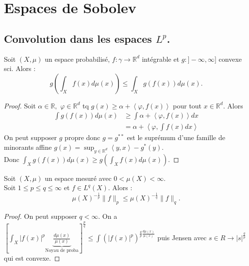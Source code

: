 \section{Espaces de Sobolev}
\subsection{Convolution dans les espaces \texorpdfstring{$L^p$}{TEXT}.}
\begin{propriete}
    Soit $(X,\mu)$ un espace probabilisé, $f:\gamma\to \mathbb{R} ^d$ intégrable et $g:]-\infty ,\infty ]$ convexe sci. Alors :
    $$g\left(\int_Xf(x)d\mu(x)\right)\le \int_Xg(f(x))d\mu(x).$$
\end{propriete}
\begin{proof}
    Soit $\alpha \in \mathbb{R} ,$ $\varphi \in \mathbb{R} ^d$ tq $g(x)\ge \alpha +\left<\varphi ,f(x) \right>$ pour tout $x\in \mathbb{R} ^d.$ Alors
    \begin{align*}
        \int g(f(x))d\mu(x)&\ge \int \alpha +\left<\varphi ,f(x) \right>dx\\
                           &= \alpha +\left<\varphi ,\int f(x)dx \right>
    \end{align*}
    On peut supposer $g$ propre donc $g=g^{**}$ est le suprémum d'une famille de minorants affine $g(x)=\sup_{y\in \mathbb{R} ^d}\left<y,x \right> -g^*(y).$\\
    Donc $\int_Xg(f(x))d\mu(x)\ge  g\left(\int_Xf(x)d\mu(x)\right)$.
\end{proof}
\begin{corollaire}
    Soit $(X,\mu)$ un espace mesuré avec $0<\mu(X)<\infty .$ \\
    Soit $1\le p\le q\le \infty $ et $f\in L^q(X).$ Alors :
    $$\mu(X)^{-\frac{1}{p}}\|f\|_p\le \mu(X)^{-\frac{1}{q}}\|f\|_q.$$
\end{corollaire}
\begin{proof}
    On peut supposer $q<\infty .$ On a $\left[ \int_X|f(x)|^p \underbrace{\frac{d\mu(x)}{\mu(x)}}_{\text{Noyau de proba}}  \right]^{\frac{p}{q}}\le \int\left( |f(x)| ^p \right) ^{\frac{q}{p}\frac{d\mu(x)}{\mu(x)}} $ puis Jensen avec $s\in R\to |s| ^{\frac{q}{p}}$ qui est convexe.
\end{proof}

